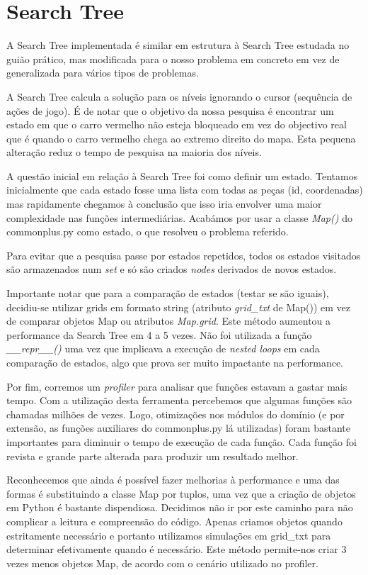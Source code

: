 \documentclass[12pt]{report}
\begin{document}
\section{Search Tree}
\par A Search Tree implementada é similar em estrutura à Search Tree estudada no guião prático, mas modificada para o nosso problema em concreto em vez de generalizada para vários tipos de problemas.
\par A Search Tree calcula a solução para os níveis ignorando o cursor (sequência de ações de jogo). É de notar que o objetivo da nossa pesquisa é encontrar um estado em que o carro vermelho não esteja bloqueado em vez do objectivo real que é quando o carro vermelho chega ao extremo direito do mapa. Esta pequena alteração reduz o tempo de pesquisa na maioria dos níveis.
\par A questão inicial em relação à Search Tree foi como definir um estado. Tentamos inicialmente que cada estado fosse uma lista com todas as peças (id, coordenadas) mas rapidamente chegamos à conclusão que isso iria envolver uma maior complexidade nas funções intermediárias. Acabámos por usar a classe \emph{Map()} do commonplus.py como estado, o que resolveu o problema referido.
\par Para evitar que a pesquisa passe por estados repetidos, todos os estados visitados são armazenados num \emph{set} e só são criados \emph{nodes} derivados de novos estados.
\par Importante notar que para a comparação de estados (testar se são iguais), decidiu-se utilizar grids em formato string (atributo \emph{grid\_txt} de Map()) em vez de comparar objetos Map ou atributos \emph{Map.grid}. Este método aumentou a performance da Search Tree em 4 a 5 vezes. Não foi utilizada a função \emph{\_\_repr\_\_()} uma vez que implicava a execução de \emph{nested loops} em cada comparação de estados, algo que prova ser muito impactante na performance.
\par Por fim, corremos um \emph{profiler} para analisar que funções estavam a gastar mais tempo. Com a utilização desta ferramenta percebemos que algumas funções são chamadas milhões de vezes. Logo, otimizações nos módulos do domínio (e por extensão, as funções auxiliares do commonplus.py lá utilizadas) foram bastante importantes para diminuir o tempo de execução de cada função. Cada função foi revista e grande parte alterada para produzir um resultado melhor.
\par Reconhecemos que ainda é possível fazer melhorias à performance e uma das formas é substituindo a classe Map por tuplos, uma vez que a criação de objetos em Python é bastante dispendiosa. Decidimos não ir por este caminho para não complicar a leitura e compreensão do código. Apenas criamos objetos quando estritamente necessário e portanto utilizamos simulações em grid\_txt para determinar efetivamente quando é necessário. Este método permite-nos criar 3 vezes menos objetos Map, de acordo com o cenário utilizado no profiler.
\end{document}

